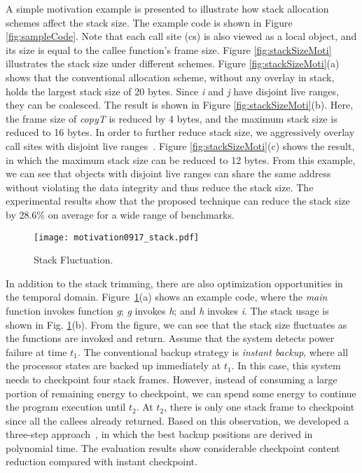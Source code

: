 A simple motivation example is presented to illustrate how stack allocation schemes affect the stack size.
The example code is shown in Figure \ref{fig:sampleCode}.
Note that each call site (cs) is also viewed as a local object, and its size is equal to the callee function's frame size. Figure \ref{fig:stackSizeMoti} illustrates the stack size under different schemes.
Figure \ref{fig:stackSizeMoti}(a) shows that the conventional allocation scheme, without any overlay in stack, holds the largest stack size of 20 bytes. Since \textit{i} and \textit{j} have disjoint live ranges, they can be coalesced. The result is shown in 
Figure \ref{fig:stackSizeMoti}(b). Here, the frame size of \textit{copyT} is reduced by 4 bytes, and the maximum stack size is reduced to 16 bytes. In order to further reduce stack size, we aggressively overlay call sites with disjoint live ranges~\cite{Li:2015:CDA:2744769.2744809}. Figure \ref{fig:stackSizeMoti}(c) shows the result, in which the maximum stack size can be reduced to 12 bytes. From this example, we can see that objects with disjoint live ranges can share the same address without violating the data integrity and thus reduce the stack size. The experimental results show that the proposed technique can reduce the stack size by 28.6\% on average for a wide range of benchmarks. 


\begin{figure}[htbp]
\centering
\texttt{[image: motivation0917\_stack.pdf]}
   \caption{Stack Fluctuation.}
   \label{fig:motviation}
\end{figure}


In addition to the stack trimming, there are also optimization opportunities in the temporal domain. Figure~\ref{fig:motviation}(a) shows an example code, where the \textit{main} function invokes function \textit{g}; \textit{g} invokes \textit{h}; and \textit{h} invokes \textit{i}. The stack usage is shown in Fig. \ref{fig:motviation}(b). From the figure, we can see that the stack size fluctuates as the functions are invoked and return. Assume that the system detects power failure at time \textit{$t_1$}. The conventional backup strategy is \textit{instant backup}, where all the processor states are backed up immediately at \textit{$t_1$}. In this case, this system needs to checkpoint four stack frames. However, instead of consuming a large portion of remaining energy to checkpoint, we can spend some energy to continue the program execution until \textit{$t_2$}. At \textit{$t_2$}, there is only one stack frame to checkpoint since all the callees already returned. Based on this observation, we developed a three-step approach~\cite{Zhao:2015:SAN:2755753.2755881}, in which the best backup positions are derived in polynomial time. The evaluation results show considerable checkpoint content reduction compared with instant checkpoint.

